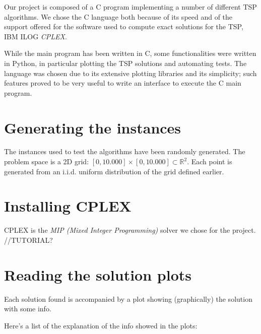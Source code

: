 Our project is composed of a C program implementing a number of different TSP algorithms. We chose the C language both because of its speed and of the support offered for the software used to compute exact solutions for the TSP, IBM ILOG \textit{CPLEX}.

While the main program has been written in C, some functionalities were written in Python, in particular plotting the TSP solutions and automating tests. The language was chosen due to its extensive plotting libraries and its simplicity; such features proved to be very useful to write an interface to execute the C main program.

\section{Generating the instances}

The instances used to test the algorithms have been randomly generated. The problem space is a 2D grid: $[0,10.000]\times[0,10.000]\subset\mathbb{R}^2$. Each point is generated from an i.i.d. uniform distribution of the grid defined earlier.

\section{Installing CPLEX}

CPLEX is the \textit{MIP (Mixed Integer Programming)} solver we chose for the project. //TUTORIAL?

\section{Reading the solution plots}

Each solution found is accompanied by a plot showing (graphically) the solution with some info.

Here's a list of the explanation of the info showed in the plots:

